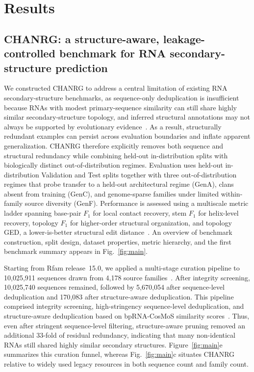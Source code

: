 \documentclass[pdflatex,sn-mathphys-num]{sn-jnl}%
\theoremstyle{thmstyleone}%
\theoremstyle{thmstyletwo}%
\theoremstyle{thmstylethree}%
\begin{document}
\section{Results}\label{sec:results}

\subsection{CHANRG: a structure-aware, leakage-controlled benchmark for RNA secondary-structure prediction}

We constructed CHANRG to address a central limitation of existing RNA secondary-structure benchmarks, as sequence-only deduplication is insufficient because RNAs with modest primary-sequence similarity can still share highly similar secondary-structure topology, and inferred structural annotations may not always be supported by evolutionary evidence~\cite{rivas2017statistical,qiu2023sequence,lasher2025bprna}.
As a result, structurally redundant examples can persist across evaluation boundaries and inflate apparent generalization.
CHANRG therefore explicitly removes both sequence and structural redundancy while combining held-out in-distribution splits with biologically distinct out-of-distribution regimes.
Evaluation uses held-out in-distribution Validation and Test splits together with three out-of-distribution regimes that probe transfer to a held-out architectural regime (GenA), clans absent from training (GenC), and genome-sparse families under limited within-family source diversity (GenF).
Performance is assessed using a multiscale metric ladder spanning base-pair $F_1$ for local contact recovery, stem $F_1$ for helix-level recovery, topology $F_1$ for higher-order structural organization, and topology GED, a lower-is-better structural edit distance~\cite{sanfeliu1983distance}.
An overview of benchmark construction, split design, dataset properties, metric hierarchy, and the first benchmark summary appears in Fig.~\ref{fig:main}.

Starting from Rfam release~15.0, we applied a multi-stage curation pipeline to 10{,}025{,}911 sequences drawn from 4{,}178 source families~\cite{ontiveros2025rfam}.
After integrity screening, 10{,}025{,}740 sequences remained, followed by 5{,}670{,}054 after sequence-level deduplication and 170{,}083 after structure-aware deduplication.
This pipeline comprised integrity screening, high-stringency sequence-level deduplication, and structure-aware deduplication based on bpRNA-CosMoS similarity scores~\cite{lasher2025bprna}.
Thus, even after stringent sequence-level filtering, structure-aware pruning removed an additional 33-fold of residual redundancy, indicating that many non-identical RNAs still shared highly similar secondary structures.
Figure~\ref{fig:main}e summarizes this curation funnel, whereas Fig.~\ref{fig:main}c situates CHANRG relative to widely used legacy resources in both sequence count and family count.
\end{document}
